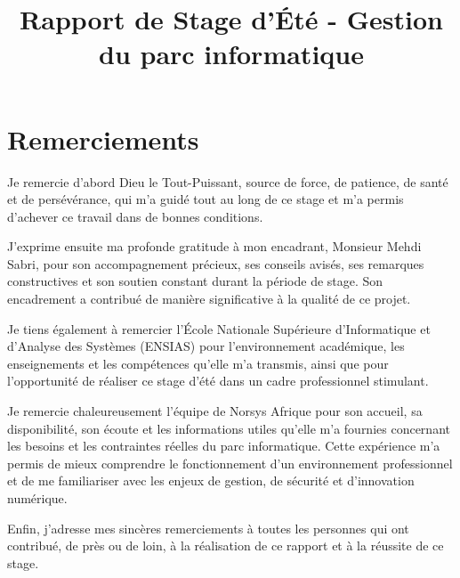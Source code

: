 \documentclass{rapportENSIAS}
\title{Rapport de Stage d'Été - Gestion du parc informatique}
\begin{document}

\jury{}


\fairemarges
\fairepagedegarde



\chapter*{Remerciements}

Je remercie d’abord Dieu le Tout-Puissant, source de force, de patience, de santé et de persévérance, qui m’a guidé tout au long de ce stage et m’a permis d’achever ce travail dans de bonnes conditions.

J’exprime ensuite ma profonde gratitude à mon encadrant, Monsieur Mehdi Sabri, pour son accompagnement précieux, ses conseils avisés, ses remarques constructives et son soutien constant durant la période de stage. Son encadrement a contribué de manière significative à la qualité de ce projet.

Je tiens également à remercier l’École Nationale Supérieure d’Informatique et d’Analyse des Systèmes (ENSIAS) pour l’environnement académique, les enseignements et les compétences qu’elle m’a transmis, ainsi que pour l’opportunité de réaliser ce stage d’été dans un cadre professionnel stimulant.

Je remercie chaleureusement l’équipe de Norsys Afrique pour son accueil, sa disponibilité, son écoute et les informations utiles qu’elle m’a fournies concernant les besoins et les contraintes réelles du parc informatique. Cette expérience m’a permis de mieux comprendre le fonctionnement d’un environnement professionnel et de me familiariser avec les enjeux de gestion, de sécurité et d’innovation numérique.

Enfin, j’adresse mes sincères remerciements à toutes les personnes qui ont contribué, de près ou de loin, à la réalisation de ce rapport et à la réussite de ce stage.


\end{document}
